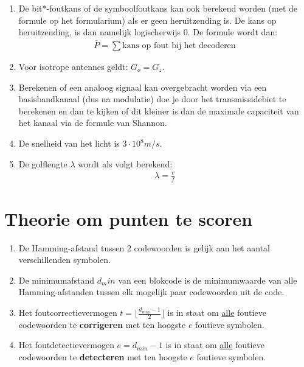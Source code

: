 \documentclass[12pt,a4paper]{article}
\begin{document}
\begin{enumerate}
\item De bit*-foutkans of de symboolfoutkans kan ook berekend worden (met de formule op het formularium) als er geen heruitzending is. De kans op heruitzending, is dan namelijk logischerwijs $0$.
De formule wordt dan:
\begin{align*}
\overline{P} = \sum\text{kans op fout bij het decoderen}
\end{align*}

\item Voor isotrope antennes geldt: $G_o = G_z$.

\item Berekenen of een analoog signaal kan overgebracht worden via een basisbandkanaal (dus na modulatie) doe je door het transmissidebiet te berekenen en dan te kijken of dit kleiner is dan de maximale capaciteit van het kanaal via de formule van Shannon.

\item De snelheid van het licht is $3 \cdot 10^8 m/s$.

\item De golflengte $\lambda$ wordt als volgt berekend:
\begin{align*}
\lambda = \frac{v}{f}
\end{align*}


\end{enumerate}

\section*{Theorie om punten te scoren}
\begin{enumerate}
\item De Hamming-afstand tussen 2 codewoorden is gelijk aan het aantal verschillenden symbolen.
\item De minimumafstand $d_min$ van een blokcode is de minimumwaarde van alle Hamming-afstanden tussen elk mogelijk paar codewoorden uit de code.
\item Het foutcorrectievermogen $t= \lfloor \frac{d_{min}-1}{2} \rfloor$ is in staat om \underline{alle} foutieve codewoorden te \textbf{corrigeren} met ten hoogste $e$ foutieve symbolen.
\item Het foutdetectievermogen $e=d_{min}-1$ is in staat om \underline{alle} foutieve codewoorden te \textbf{detecteren} met ten hoogste $e$ foutieve symbolen.
\end{enumerate}
\end{document}
